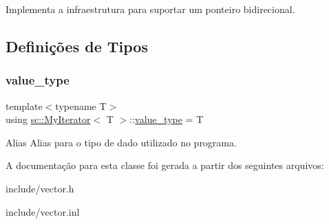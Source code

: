 Implementa a infraestrutura para suportar um ponteiro bidirecional. 

\subsection{Definições de Tipos}
\mbox{\label{classsc_1_1MyIterator_a87259a3ccf8ff488d496b658324c4b2d}} 
\subsubsection{\texorpdfstring{value\+\_\+type}{value\_type}}
{\footnotesize\ttfamily template$<$typename T$>$ \\
using \hyperlink{classsc_1_1MyIterator}{sc\+::\+My\+Iterator}$<$ T $>$\+::\hyperlink{classsc_1_1MyIterator_a87259a3ccf8ff488d496b658324c4b2d}{value\+\_\+type} =  T}

Alias Alias para o tipo de dado utilizado no programa. 

A documentação para esta classe foi gerada a partir dos seguintes arquivos\+:\begin{DoxyCompactItemize}
\item 
include/vector.\+h\item 
include/vector.\+inl\end{DoxyCompactItemize}
